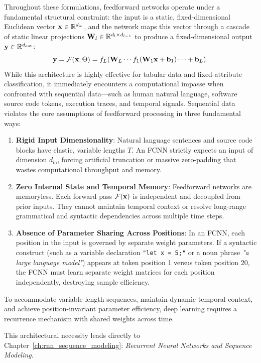 \documentclass[../../main.tex]{subfiles}
\begin{document}
Throughout these formulations, feedforward networks operate under a fundamental structural constraint: the input is a static, fixed-dimensional Euclidean vector $\mathbf{x} \in \mathbb{R}^{d_{\text{in}}}$, and the network maps this vector through a cascade of static linear projections $\mathbf{W}_l \in \mathbb{R}^{d_l \times d_{l-1}}$ to produce a fixed-dimensional output $\mathbf{y} \in \mathbb{R}^{d_{\text{out}}}$:
\begin{equation}
\label{eq:fcnn_static_cascade}
\mathbf{y} = \mathcal{F}(\mathbf{x}; \Theta) = f_L(\mathbf{W}_L \cdots f_1(\mathbf{W}_1 \mathbf{x} + \mathbf{b}_1) \cdots + \mathbf{b}_L).
\end{equation}
While this architecture is highly effective for tabular data and fixed-attribute classification, it immediately encounters a computational impasse when confronted with sequential data---such as human natural language, software source code tokens, execution traces, and temporal signals. Sequential data violates the core assumptions of feedforward processing in three fundamental ways:
\begin{enumerate}
    \item \textbf{Rigid Input Dimensionality}: Natural language sentences and source code blocks have elastic, variable lengths $T$. An FCNN strictly expects an input of dimension $d_{\text{in}}$, forcing artificial truncation or massive zero-padding that wastes computational throughput and memory.
    \item \textbf{Zero Internal State and Temporal Memory}: Feedforward networks are memoryless. Each forward pass $\mathcal{F}(\mathbf{x})$ is independent and decoupled from prior inputs. They cannot maintain temporal context or resolve long-range grammatical and syntactic dependencies across multiple time steps.
    \item \textbf{Absence of Parameter Sharing Across Positions}: In an FCNN, each position in the input is governed by separate weight parameters. If a syntactic construct (such as a variable declaration \texttt{"let x = 5;"} or a noun phrase \textit{"a large language model"}) appears at token position 1 versus token position 20, the FCNN must learn separate weight matrices for each position independently, destroying sample efficiency.
\end{enumerate}

To accommodate variable-length sequences, maintain dynamic temporal context, and achieve position-invariant parameter efficiency, deep learning requires a recurrence mechanism with shared weights across time.

This architectural necessity leads directly to Chapter~\ref{ch:rnn_sequence_modeling}: \emph{Recurrent Neural Networks and Sequence Modeling}.

\clearpage
\thispagestyle{empty}
\null
\clearpage
\end{document}
